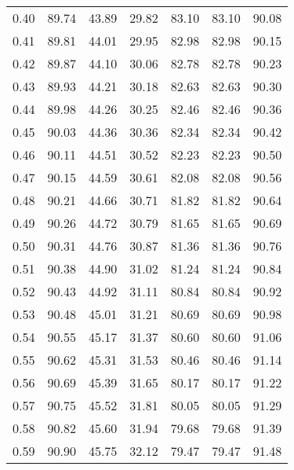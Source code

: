 \begin{tabular}{|c|c|c|c|c|c|c|}
      0.40 &     89.74 &     43.89 &      29.82 &   83.10 &      83.10 &         90.08 \\
      0.41 &     89.81 &     44.01 &      29.95 &   82.98 &      82.98 &         90.15 \\
      0.42 &     89.87 &     44.10 &      30.06 &   82.78 &      82.78 &         90.23 \\
      0.43 &     89.93 &     44.21 &      30.18 &   82.63 &      82.63 &         90.30 \\
      0.44 &     89.98 &     44.26 &      30.25 &   82.46 &      82.46 &         90.36 \\
      0.45 &     90.03 &     44.36 &      30.36 &   82.34 &      82.34 &         90.42 \\
      0.46 &     90.11 &     44.51 &      30.52 &   82.23 &      82.23 &         90.50 \\
      0.47 &     90.15 &     44.59 &      30.61 &   82.08 &      82.08 &         90.56 \\
      0.48 &     90.21 &     44.66 &      30.71 &   81.82 &      81.82 &         90.64 \\
      0.49 &     90.26 &     44.72 &      30.79 &   81.65 &      81.65 &         90.69 \\
      0.50 &     90.31 &     44.76 &      30.87 &   81.36 &      81.36 &         90.76 \\
      0.51 &     90.38 &     44.90 &      31.02 &   81.24 &      81.24 &         90.84 \\
      0.52 &     90.43 &     44.92 &      31.11 &   80.84 &      80.84 &         90.92 \\
      0.53 &     90.48 &     45.01 &      31.21 &   80.69 &      80.69 &         90.98 \\
      0.54 &     90.55 &     45.17 &      31.37 &   80.60 &      80.60 &         91.06 \\
      0.55 &     90.62 &     45.31 &      31.53 &   80.46 &      80.46 &         91.14 \\
      0.56 &     90.69 &     45.39 &      31.65 &   80.17 &      80.17 &         91.22 \\
      0.57 &     90.75 &     45.52 &      31.81 &   80.05 &      80.05 &         91.29 \\
      0.58 &     90.82 &     45.60 &      31.94 &   79.68 &      79.68 &         91.39 \\
      0.59 &     90.90 &     45.75 &      32.12 &   79.47 &      79.47 &         91.48 \\

\end{tabular}
